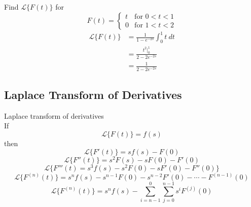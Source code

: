 \documentclass[12pt]{article}
\newcommand{\Lap}{\mathscr{L}}
\begin{document}
\begin{example}{Find $\Lap \{ F(t) \}$ for \[
    F(t) =
    \begin{cases}
        t & \text{for } 0 < t < 1 \\
        0 & \text{for } 1 < t < 2
    \end{cases}
\]}{}
    \begin{align*}
        \Lap \{ F(t) \} &= \frac{1}{1-e^{-2s}} \int_{0}^{1} {t} \: d{t} \\
        &= \frac{t^2 \bigg|_0^1}{2 - 2e^{-2s}} \\
        &= \frac{1}{2 - 2e^{-2s}}
    \end{align*}
\end{example}


\subsection{Laplace Transform of Derivatives}
\begin{theorem}{Laplace transform of derivatives}{}
    \\If \[
        \Lap \{ F(t) \} = f(s)
    \] then \[
        \Lap \{ F'(t) \} = sf(s) - F(0)
    \] \[
        \Lap \{ F''(t) \} = s^2F(s) - sF(0) - F'(0)
    \] \[
        \Lap \{ F'''(t) = s^3f(s) - s^2F(0) - sF'(0) - F''(0) \}
    \] \[
        \boxed{ \Lap \{ F^{(n)}(t) \} = s^nf(s) - s^{n-1}F(0) - s^{n-2}F'(0) - \cdots - F^{(n-1)}(0) }
    \] \[
        \boxed{ \Lap \{ F^{(n)}(t) \} = s^nf(s) - \sum_{i=n-1}^{0}\sum_{j=0}^{n-1} s^i F^{(j)}(0) }
    \]
\end{theorem}
\end{document}
